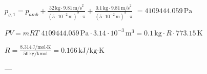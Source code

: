 \( p_{g,1} = p_{amb} + \frac{32 \, \text{kg} \cdot 9.81 \, \text{m/s}^2}{\left(5 \cdot 10^{-2} \, \text{m}\right)^2 \cdot \pi} + \frac{0.1 \, \text{kg} \cdot 9.81 \, \text{m/s}^2}{\left(5 \cdot 10^{-2} \, \text{m}\right)^2 \cdot \pi} \)  
\( = 4109444.059 \, \text{Pa} \)  

\( PV = mRT \)  
\( 4109444.059 \, \text{Pa} \cdot 3.14 \cdot 10^{-3} \, \text{m}^3 = 0.1 \, \text{kg} \cdot R \cdot 773.15 \, \text{K} \)  

\( R = \frac{8.314 \, \text{J/mol·K}}{50 \, \text{kg/kmol}} = 0.166 \, \text{kJ/kg·K} \)  

---